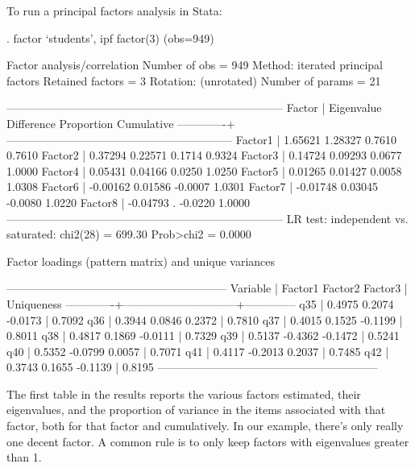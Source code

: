 \documentclass[12pt]{article}
\begin{document}
To run a principal factors analysis in Stata:
\begin{stlog}
  . factor `students', ipf factor(3)
(obs=949)

Factor analysis/correlation                        Number of obs    =      949
    Method: iterated principal factors             Retained factors =        3
    Rotation: (unrotated)                          Number of params =       21

    --------------------------------------------------------------------------
         Factor  |   Eigenvalue   Difference        Proportion   Cumulative
    -------------+------------------------------------------------------------
        Factor1  |      1.65621      1.28327            0.7610       0.7610
        Factor2  |      0.37294      0.22571            0.1714       0.9324
        Factor3  |      0.14724      0.09293            0.0677       1.0000
        Factor4  |      0.05431      0.04166            0.0250       1.0250
        Factor5  |      0.01265      0.01427            0.0058       1.0308
        Factor6  |     -0.00162      0.01586           -0.0007       1.0301
        Factor7  |     -0.01748      0.03045           -0.0080       1.0220
        Factor8  |     -0.04793            .           -0.0220       1.0000
    --------------------------------------------------------------------------
    LR test: independent vs. saturated:  chi2(28) =  699.30 Prob>chi2 = 0.0000

Factor loadings (pattern matrix) and unique variances

    -----------------------------------------------------------
        Variable |  Factor1   Factor2   Factor3 |   Uniqueness 
    -------------+------------------------------+--------------
             q35 |   0.4975    0.2074   -0.0173 |      0.7092  
             q36 |   0.3944    0.0846    0.2372 |      0.7810  
             q37 |   0.4015    0.1525   -0.1199 |      0.8011  
             q38 |   0.4817    0.1869   -0.0111 |      0.7329  
             q39 |   0.5137   -0.4362   -0.1472 |      0.5241  
             q40 |   0.5352   -0.0799    0.0057 |      0.7071  
             q41 |   0.4117   -0.2013    0.2037 |      0.7485  
             q42 |   0.3743    0.1655   -0.1139 |      0.8195  
    -----------------------------------------------------------
\end{stlog}

The first table in the results reports the various factors estimated,
their eigenvalues, and the proportion of variance in the items
associated with that factor, both for that factor and cumulatively. 
In our example, there's only really one decent factor. A common rule
is to only keep factors with eigenvalues greater than 1.
\end{document}
